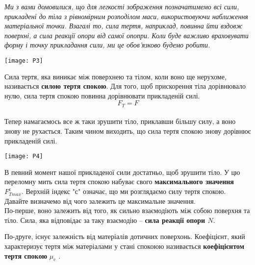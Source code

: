 \documentclass[a4paper,12pt]{article}
\begin{document}
\textit{Ми з вами домовилися, що для легкості зображення позначатимемо всі сили, прикладені до тіла з рівномірним розподілом маси, використовуючи наближення матеріальної точки. Взагалі то, сила тертя, наприклад, повинна йти вздовж поверхні, а сила реакції опори від самої опопри. Коли буде важливо враховувати форму і точку прикладання сили, ми це обов'язково будемо робити. }\begin{center} \texttt{[image: P3]} \end{center}
Сила тертя, яка виникає між поверхнею та тілом, коли воно ще нерухоме, називається \textcolor{EdErablue}{\textbf{силою тертя спокою}}.  Для того, щоб прискорення тіла дорівнювало нулю, сила тертя спокою повинна дорівнювати прикладеній силі. $$F_T = F$$\\

Тепер намагаємось все ж таки зрушити тіло, приклавши більшу силу, а воно знову не рухається. Таким чином виходить, що сила тертя спокою знову дорівнює прикладеній силі. \begin{center} \texttt{[image: P4]} \end{center}
В певний момент нашої прикладеної сили достатньо, щоб зрушити тіло. У цю переломну мить сила тертя спокою набуває свого \textbf{максимального значення} $F^\text{с}_{Tmax}$. Верхній індекс "с" \thinspace означає, що ми розглядаємо силу тертя спокою. \\

Давайте визначемо від чого залежить це максимальне значення.\\

По-перше, воно залежить від того, як сильно взаємодіють між собою поверхня та тіло. Сила, яка відповідає за таку взаємодію – \textcolor{EdErablue}{\textbf{сила реакції опори $N$}}.\\ \newline

По-друге, існує залежність від матеріалів дотичних поверхонь. Коефіцієнт, який характеризує тертя між матеріалами у стані спокоюю називається \textcolor{EdErablue}{\textbf{коефіцієнтом тертя спокою} $\mu_{\text{c}}$ }.\\

\newpage
\end{document}
